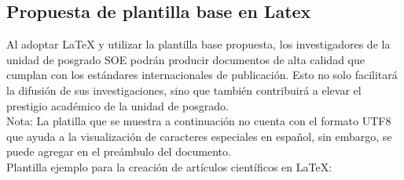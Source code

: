 \documentclass[10pt]{article}
\begin{document}
    \subsection{Propuesta de plantilla base en Latex}
    Al adoptar LaTeX y utilizar la plantilla base propuesta, los investigadores de la unidad de posgrado SOE podrán producir documentos de alta calidad que cumplan con los estándares internacionales de publicación. 
    Esto no solo facilitará la difusión de sus investigaciones, sino que también contribuirá a elevar el prestigio académico de la unidad de posgrado.\\
    Nota: La platilla que se muestra a continuación no cuenta con el formato UTF8 que ayuda a la visualización de caracteres especiales en español, sin embargo, se puede agregar en el preámbulo del documento.\\
    Plantilla ejemplo para la creación de artículos científicos en LaTeX:
\end{document}
